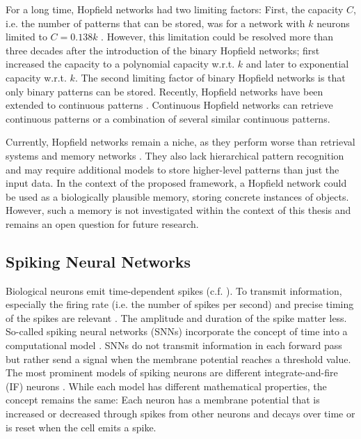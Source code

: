 For a long time, Hopfield networks had two limiting factors: First, the capacity $C$, i.e. the number of patterns that can be stored, was for a network with $k$ neurons limited to $C=0.138k$ .
However, this limitation could be resolved more than three decades after the introduction of the binary Hopfield networks; 
 first increased the capacity to a polynomial capacity w.r.t. $k$ and  later to exponential capacity w.r.t. $k$.
The second limiting factor of binary Hopfield networks is that only binary patterns can be stored.
Recently, Hopfield networks have been extended to continuous patterns .
Continuous Hopfield networks can retrieve continuous patterns or a combination of several similar continuous patterns.

Currently, Hopfield networks remain a niche, as they perform worse than retrieval systems  and memory networks .
They also lack hierarchical pattern recognition and may require additional models to store higher-level patterns than just the input data.
In the context of the proposed framework, a Hopfield network could be used as a biologically plausible memory, storing concrete instances of objects.
However, such a memory is not investigated within the context of this thesis and remains an open question for future research.


\subsection{Spiking Neural Networks}
Biological neurons emit time-dependent spikes (c.f. ).
To transmit information, especially the firing rate (i.e. the number of spikes per second) and precise timing of the spikes are relevant .
The amplitude and duration of the spike matter less.
So-called spiking neural networks (SNNs) incorporate the concept of time into a computational model .
SNNs do not transmit information in each forward pass but rather send a signal when the membrane potential reaches a threshold value. 
The most prominent models of spiking neurons are different integrate-and-fire (IF) neurons .
While each model has different mathematical properties, the concept remains the same: Each neuron has a membrane potential that is increased or decreased through spikes from other neurons and decays over time or is reset when the cell emits a spike.


